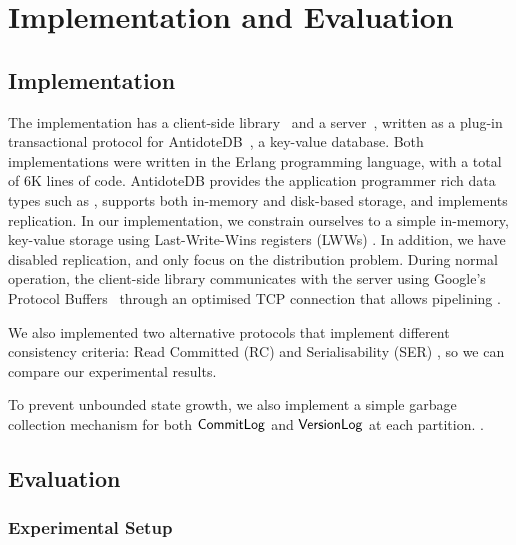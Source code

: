 \cleardoublepage
\chapter{Implementation and Evaluation}
\label{eval_chapter}

\section{Implementation}

The  implementation has a client-side library~\citep{pvc-client} and a server~\citep{pvc-server}, written as a plug-in transactional protocol for AntidoteDB~\citep{antidote-db}, a key-value database. Both implementations were written in the Erlang programming language, with a total of 6K lines of code. AntidoteDB provides the application programmer rich data types such as , supports both in-memory and disk-based storage, and implements  replication. In our implementation, we constrain ourselves to a simple in-memory, key-value storage using Last-Write-Wins registers (LWWs) . In addition, we have disabled replication, and only focus on the distribution problem. During normal operation, the client-side library communicates with the server using Google's Protocol Buffers~\citep{protobuf} through an optimised TCP connection that allows pipelining .

We also implemented two alternative protocols that implement different consistency criteria: Read Committed (RC) and Serialisability (SER) , so we can compare our experimental results.

To prevent unbounded state growth, we also implement a simple garbage collection mechanism for both $\mathsf{CommitLog}$ and $\mathsf{VersionLog}$ at each partition. .

\section{Evaluation}


\subsection{Experimental Setup}

